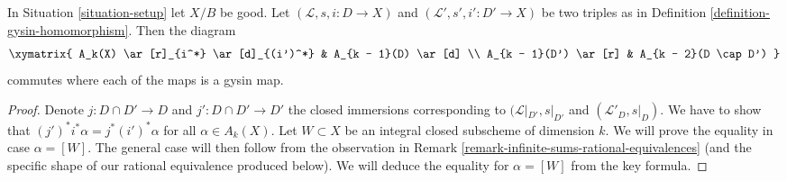 \begin{lemma}
\label{lemma-gysin-commutes-gysin}
In Situation \ref{situation-setup} let $X/B$ be good.
Let $(\mathcal{L}, s, i : D \to X)$ and
$(\mathcal{L}', s', i' : D' \to X)$ be two triples as in
Definition \ref{definition-gysin-homomorphism}. Then the diagram
$$
\xymatrix{
A_k(X) \ar[r]_{i^*} \ar[d]_{(i')^*} & A_{k - 1}(D) \ar[d] \\
A_{k - 1}(D') \ar[r] & A_{k - 2}(D \cap D')
}
$$
commutes where each of the maps is a gysin map.
\end{lemma}

\begin{proof}
Denote $j : D \cap D' \to D$ and $j' : D \cap D' \to D'$ the closed
immersions corresponding to $(\mathcal{L}|_{D'}, s|_{D'}$ and
$(\mathcal{L}'_D, s|_D)$. We have to show that
$(j')^*i^*\alpha = j^* (i')^*\alpha$ for all $\alpha \in A_k(X)$.
Let $W \subset X$ be an integral closed subscheme of dimension $k$.
We will prove the equality in case $\alpha = [W]$.
The general case will then follow from the observation in
Remark \ref{remark-infinite-sums-rational-equivalences}
(and the specific shape of our rational equivalence produced below).
We will deduce the equality for $\alpha = [W]$ from the key formula.


\end{proof}
